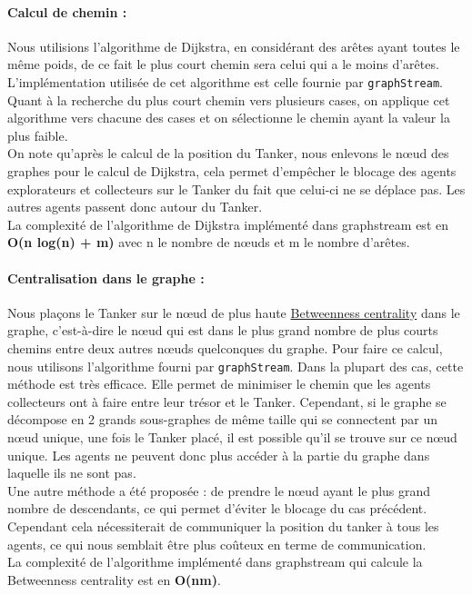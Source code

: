 \documentclass[10pt]{article}
\newcommand\tab[1][0.65cm]{\hspace*{#1}}
\begin{document}
\paragraph{Calcul de chemin :} Nous utilisions l'algorithme de Dijkstra, en considérant des arêtes ayant toutes le même poids, de ce fait le plus court chemin sera celui qui a le moins d'arêtes. L'implémentation utilisée de cet algorithme est celle fournie par \texttt{graphStream}. Quant à la recherche du plus court chemin vers plusieurs cases, on applique cet algorithme vers chacune des cases et on sélectionne le chemin ayant la valeur la plus faible.\\
\tab On note qu'après le calcul de la position du Tanker, nous enlevons le n\oe{}ud des graphes pour le calcul de Dijkstra, cela permet d'empêcher le blocage des agents explorateurs et collecteurs sur le Tanker du fait que celui-ci ne se déplace pas. Les autres agents passent donc autour du Tanker.\\
\tab La complexité de l'algorithme de Dijkstra implémenté dans graphstream est en \textbf{O(n log(n) + m)} avec n le nombre de n\oe{}uds et m le nombre d'arêtes.

\paragraph{Centralisation dans le graphe :} Nous plaçons le Tanker sur le n\oe{}ud de plus haute \href{https://en.wikipedia.org/wiki/Betweenness_centrality}{Betweenness centrality} dans le graphe, c'est-à-dire le n\oe{}ud  qui est dans le plus grand nombre de plus courts chemins entre deux autres n\oe{}uds quelconques du graphe. Pour faire ce calcul, nous utilisons l'algorithme fourni par \texttt{graphStream}. Dans la plupart des cas, cette méthode est très efficace. Elle permet de minimiser le chemin que les agents collecteurs ont à faire entre leur trésor et le Tanker. Cependant, si le graphe se décompose en 2 grands sous-graphes de même taille qui se connectent par un n\oe{}ud unique, une fois le Tanker placé, il est possible qu'il se trouve sur ce n\oe{}ud unique. Les agents ne peuvent donc plus accéder à la partie du graphe dans laquelle ils ne sont pas.\\
\tab Une autre méthode a été proposée : de prendre le n\oe{}ud ayant le plus grand nombre de descendants, ce qui permet d'éviter le blocage du cas précédent. Cependant cela nécessiterait de communiquer la position du tanker à tous les agents, ce qui nous semblait être plus coûteux en terme de communication.\\
\tab La complexité de l'algorithme implémenté dans graphstream qui calcule la Betweenness centrality est en \textbf{O(nm)}.
\end{document}

